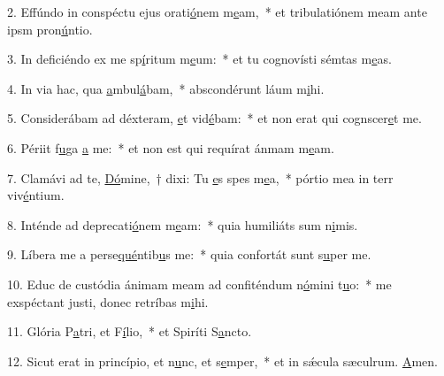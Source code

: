 2. Effúndo in conspéctu ejus orati\uline{ó}nem m\uline{e}am,~* et tribulatiónem meam ante ipsm pron\uline{ú}ntio.\par 
3. In deficiéndo ex me sp\uline{í}ritum m\uline{e}um:~* et tu cognovísti sémtas m\uline{e}as.\par 
4. In via hac, qua \uline{a}mbul\uline{á}bam,~* abscondérunt láum m\uline{i}hi.\par 
5. Considerábam ad déxteram, \uline{e}t vid\uline{é}bam:~* et non erat qui cognscer\uline{e}t me.\par 
6. Périit f\uline{u}ga \uline{a} me:~* et non est qui requírat ánmam m\uline{e}am.\par 
7. Clamávi ad te, \uline{Dó}mine,~† dixi: Tu \uline{e}s spes m\uline{e}a,~* pórtio mea in terr viv\uline{é}ntium.\par 
8. Inténde ad deprecati\uline{ó}nem m\uline{e}am:~* quia humiliáts sum n\uline{i}mis.\par 
9. Líbera me a perse\uline{qué}ntib\uline{u}s me:~* quia confortát sunt s\uline{u}per me.\par 
10. Educ de custódia ánimam meam ad confiténdum n\uline{ó}mini t\uline{u}o:~* me exspéctant justi, donec retríbas m\uline{i}hi.\par 
11. Glória P\uline{a}tri, et F\uline{í}lio,~* et Spiríti S\uline{a}ncto.\par 
12. Sicut erat in princípio, et n\uline{u}nc, et s\uline{e}mper,~* et in sǽcula sæculrum. \uline{A}men.\par 
